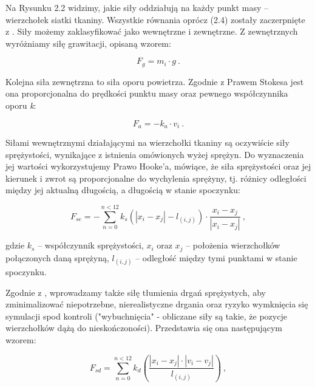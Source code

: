 			
			
			
			Na Rysunku 2.2 widzimy, jakie siły oddziałują na każdy punkt masy -- wierzchołek siatki tkaniny. Wszystkie równania oprócz (2.4) zostały zaczerpnięte z \cite{cloth-dobre-wzory}. Siły możemy zaklasyfikować jako wewnętrzne i zewnętrzne. Z zewnętrznych wyróżniamy siłę grawitacji, opisaną wzorem:
			
			\begin{equation}
			F_{g} = m_{i} \cdot g \ .
			\end{equation}
			
			Kolejna siła zewnętrzna to siła oporu powietrza. Zgodnie z Prawem Stokesa jest ona proporcjonalna do prędkości punktu masy oraz pewnego współczynnika oporu \emph{k}:
			
			\begin{equation}
			F_{a} = -k_{a} \cdot v_{i} \ .
			\end{equation}
			
			Siłami wewnętrznymi działającymi na wierzchołki tkaniny są oczywiście siły sprężystości, wynikające z istnienia omówionych wyżej sprężyn. Do wyznaczenia jej wartości wykorzystujemy Prawo Hooke'a, mówiące, że siła sprężystości oraz jej kierunek i zwrot są proporcjonalne do wychylenia sprężyny, tj. różnicy odległości między jej aktualną długością, a długością w stanie spoczynku:
			
			\begin{equation}
			F_{se} = - \sum_{n = 0}^{n < 12} k_{s} (|x_{i} - x_{j}| - l_{(i, j)}) \cdot \frac{x_{i} - x_{j}}{|x_{i} - x_{j}|} \ ,
			\end{equation}
			
			gdzie \(k_{s}\) -- współczynnik sprężystości, \(x_{i}\) oraz \(x_{j}\) -- położenia wierzchołków połączonych daną sprężyną, \(l_{(i, j)}\) -- odległość między tymi punktami w stanie spoczynku.
			
			Zgodnie z \cite{receptury}, wprowadzamy także siłę tłumienia drgań sprężystych, aby zminimalizować niepotrzebne, nierealistyczne drgania oraz ryzyko wymknięcia się symulacji spod kontroli ("wybuchnięcia" - obliczane siły są takie, że pozycje wierzchołków dążą do nieskończoności). Przedstawia się ona następującym wzorem:
			
			\begin{equation}
			F_{sd} = \sum_{n = 0}^{n < 12} k_{d} (\frac{|x_{i} - x_{j}| \cdot |v_{i} - v_{j}|}{l_{(i, j)}}) \ ,
			\end{equation}
			
